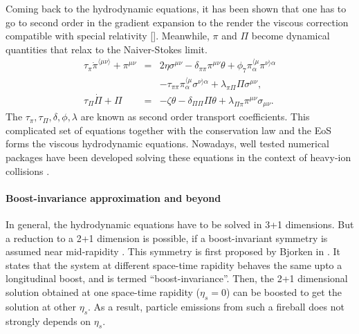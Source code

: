 Coming back to the hydrodynamic equations, it has been shown that one has to go to second order in the gradient expansion to the render the viscous correction compatible with special relativity [].
Meanwhile, $\pi$ and $\Pi$ become dynamical quantities that relax to the Naiver-Stokes limit.
\begin{eqnarray}
\tau_\pi \dot{\pi}^{\langle\mu\nu\rangle}+\pi^{\mu\nu} &=& 2\eta\sigma^{\mu\nu}- \delta_{\pi\pi}\pi^{\mu\nu}\theta + \phi_7 \pi_{\alpha}^{\langle\mu}\pi^{\nu\rangle\alpha}\\ 
\nonumber
&& -\tau_{\pi\pi}\pi_{\alpha}^{\langle\mu}\sigma^{\nu\rangle\alpha} + \lambda_{\pi\Pi}\Pi\sigma^{\mu\nu},
\\
\tau_{\Pi}\dot{\Pi} + \Pi &=& -\zeta\theta - \delta_{\Pi\Pi}\Pi\theta + \lambda_{\Pi\pi}\pi^{\mu\nu}\sigma_{\mu\nu}.
\end{eqnarray}
The $\tau_\pi, \tau_\Pi, \delta, \phi, \lambda$ are known as second order transport coefficients.
This complicated set of equations together with the conservation law and the EoS forms the viscous hydrodynamic equations.
Nowadays, well tested numerical packages have been developed solving these equations in the context of heavy-ion collisions \cite{Song:2007ux,Shen:2014vra,Schenke:2010nt,Karpenko:2013wva}.

\paragraph{Boost-invariance approximation and beyond}
In general, the hydrodynamic equations have to be solved in 3+1 dimensions.
But a reduction to a 2+1 dimension is possible, if a boost-invariant symmetry is assumed near mid-rapidity \cite{Miller:2007ri, Drescher:2006ca, Schenke:2012wb, Niemi:2015qia, Moreland:2014oya, Chatterjee:2015aja}.
This symmetry is first proposed by Bjorken in \cite{PhysRevD.27.140}.
It states that the system at different space-time rapidity behaves the same upto a longitudinal boost, and is termed ``boost-invariance''.
Then, the 2+1 dimensional solution obtained at one space-time rapidity ($\eta_s = 0$) can be boosted to get the solution at other $\eta_s$.
As a result, particle emissions from such a fireball does not strongly depends on $\eta_s$.

